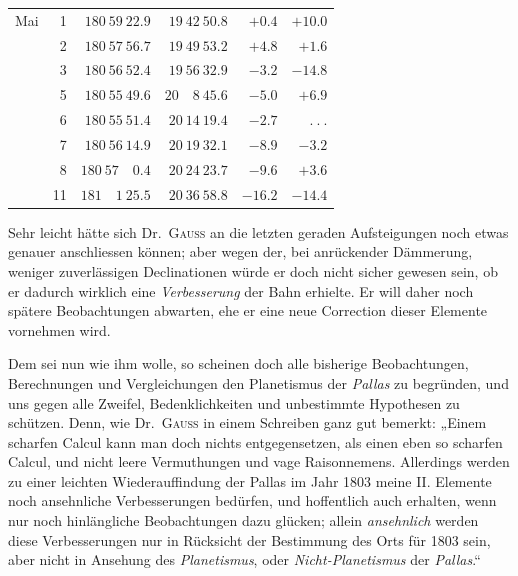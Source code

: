 \begin{center}
{\begin{tabular}{r r|r|r|r|r}
Mai&1&$180\ 59\ 22.9$&$19\ 42\ 50.8$&$+0.4$&$+10.0$\\
&2&$180\ 57\ 56.7$&$19\ 49\ 53.2$&$+4.8$&$+1.6$\\
&3&$180\ 56\ 52.4$&$19\ 56\ 32.9$&$-3.2$&$-14.8$\\
&5&$180\ 55\ 49.6$&$20\quad8\ 45.6$&$-5.0$&$+6.9$\\
&6&$180\ 55\ 51.4$&$20\ 14\ 19.4$&$-2.7$&$\ .\ .\ .$\\
&7&$180\ 56\ 14.9$&$20\ 19\ 32.1$&$-8.9$&$-3.2$\\
&8&$180\ 57\quad0.4$&$20\ 24\ 23.7$&$-9.6$&$+3.6$\\
&11&$181\quad1\ 25.5$&$20\ 36\ 58.8$&$-16.2$&$-14.4$
\end{tabular}}
\end{center}
%

Sehr leicht hätte sich Dr.\ \textsc{Gauss} an die letzten geraden Aufsteigungen noch etwas genauer anschliessen können; aber wegen der, bei anrückender Dämmerung, weniger zuverlässigen Declinationen würde er doch nicht sicher gewesen sein, ob er dadurch wirklich eine \textit{Verbesserung} der Bahn erhielte. Er will daher noch spätere Beobachtungen abwarten, ehe er eine neue Correction dieser Elemente vornehmen wird.

Dem sei nun wie ihm wolle, so scheinen doch alle bisherige Beobachtungen, Berechnungen und Vergleichungen den Planetismus der \textit{Pallas} zu begründen, und uns gegen alle Zweifel, Bedenklichkeiten und unbestimmte Hypothesen zu schützen. Denn, wie Dr.\ \textsc{Gauss} in einem Schreiben ganz gut bemerkt: „Einem scharfen Calcul kann man doch nichts entgegensetzen, als einen eben so scharfen Calcul, und nicht leere Vermuthungen und vage Raisonnemens. Allerdings werden zu einer leichten Wiederauffindung der Pallas im Jahr 1803 meine II. Elemente noch ansehnliche Verbesserungen bedürfen, und hoffentlich auch erhalten, wenn nur noch hinlängliche Beobachtungen dazu glücken; allein \textit{ansehnlich} werden diese Verbesserungen nur in Rücksicht der Bestimmung des Orts für 1803 sein, aber nicht in Ansehung des \textit{Planetismus}, oder \textit{Nicht-Planetismus} der \textit{Pallas}.“

